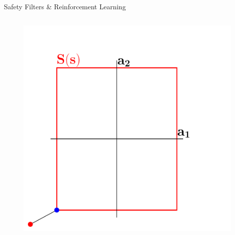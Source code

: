 \documentclass[lecture]{beamer}
\begin{document}
\begin{frame}{\normalsize Safety Filters \& Reinforcement Learning}
\begin{columns}[t]


  \begin{overlayarea}{\textwidth}{.5\textheight}
    \begin{figure}
     \newcommand{\FS}{1}
        {
        \center
	\includegraphics[width=1\textwidth,clip]{Codes/SafetyFilters/Projection0.pdf}
	}
	      \only<4>
        {
        \center
}
\end{figure}
\end{overlayarea}
\end{columns}
\end{frame}
\end{document}

